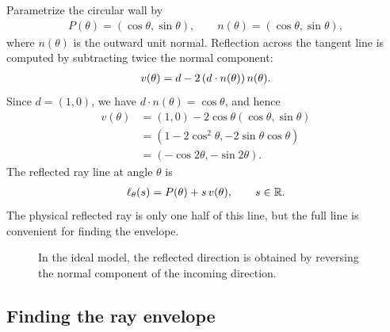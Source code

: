 \documentclass[11pt]{article}
\begin{document}
Parametrize the circular wall by
\begin{align}
  P(\theta)=(\cos\theta,\sin\theta),
  \qquad
  n(\theta)=(\cos\theta,\sin\theta),
\end{align}
where \(n(\theta)\) is the outward unit normal. Reflection across the tangent line is computed by subtracting twice the normal component:
\begin{align}
  v(\theta)=d-2\left( d\cdot n(\theta) \right)n(\theta).
\end{align}
Since \(d=(1,0)\), we have \(d\cdot n(\theta)=\cos\theta\), and hence
\begin{align}
  v(\theta)
    &=(1,0)-2\cos\theta(\cos\theta,\sin\theta)\\
    &=(1-2\cos^2\theta,-2\sin\theta\cos\theta)\\
    &=(-\cos2\theta,-\sin2\theta).
  \label{eq:reflected-direction}
\end{align}
The reflected ray line at angle \(\theta\) is
\begin{align}
  \ell_\theta(s)=P(\theta)+s\,v(\theta),
  \qquad s\in\mathbb{R}.
  \label{eq:ray-parametric}
\end{align}
The physical reflected ray is only one half of this line, but the full line is convenient for finding the envelope.

\begin{figure}[htbp]
  \centering
  \caption{In the ideal model, the reflected direction is obtained by reversing the normal component of the incoming direction.}
  \label{fig:reflection-geometry}
\end{figure}

\subsection{Finding the ray envelope}
\end{document}
